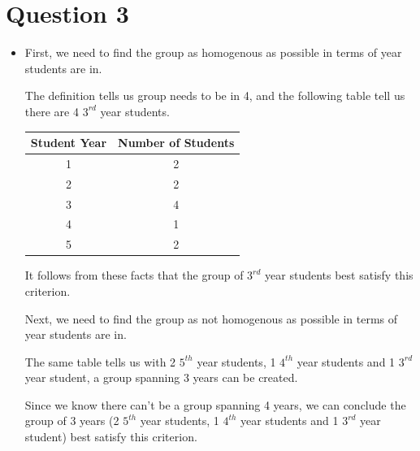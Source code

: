 \documentclass[12pt]{article}
\begin{document}
\section*{Question 3}
\begin{itemize}
    \item

    First, we need to find the group as homogenous as possible in terms of year students
    are in.

    \bigskip

    The definition tells us group needs to be in 4,
    and the following table tell us there are 4 $3^{rd}$ year students.

    \bigskip

    \begin{center}
        \begin{tabular}{|c|c|}
            \hline
            Student Year & Number of Students\\
            \hline
            1 & 2\\
            \hline
            2 & 2\\
            \hline
            3 & 4\\
            \hline
            4 & 1\\
            \hline
            5 & 2\\
            \hline
        \end{tabular}
    \end{center}

    \bigskip

    It follows from these facts that the group of $3^{rd}$ year students best satisfy
    this criterion.

    \bigskip

    Next, we need to find the group as not homogenous as possible in terms of year students
    are in.

    \bigskip

    The same table tells us with 2 $5^{th}$ year students, 1 $4^{th}$
    year students and 1 $3^{rd}$ year student, a group spanning 3 years can be
    created.

    \bigskip

    Since we know there can't be a group spanning 4 years, we can conclude the
    group of 3 years (2 $5^{th}$ year students, 1 $4^{th}$ year students and 1
    $3^{rd}$ year student) best satisfy this criterion.

    \bigskip

    \begin{mdframed}

    \end{mdframed}

\end{itemize}
\end{document}
